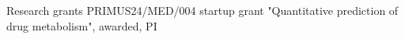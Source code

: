 \begin{rubric}{Research grants}
%
\entry*[\hspace{1.05cm}2024]%
  PRIMUS24/MED/004 startup grant "Quantitative prediction of drug metabolism", awarded, PI
\end{rubric}
